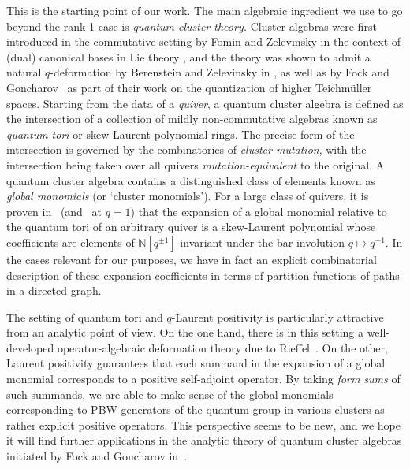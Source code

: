 \documentclass[11pt, reqno]{amsart}
\theoremstyle{definition}
\numberwithin{equation}{section}
\begin{document}
This is the starting point of our work. 
The main algebraic ingredient we use to go beyond the rank 1 case is \emph{quantum cluster theory.} Cluster algebras were first introduced in the commutative setting by Fomin and Zelevinsky in the context of (dual) canonical bases in Lie theory \cite{Lus93}, and the theory was shown to admit a natural $q$-deformation by Berenstein and Zelevinsky in \cite{BZ05}, as well as by Fock and Goncharov~\cite{FG09} as part of their work on the quantization of higher Teichm\"uller spaces. Starting from the data of a \emph{quiver}, a quantum cluster algebra is defined as the intersection of a collection of mildly non-commutative algebras known as \emph{quantum tori} or skew-Laurent polynomial rings. The precise form of the intersection is governed by the combinatorics of \emph{cluster mutation}, with the intersection being taken over all quivers \emph{mutation-equivalent} to the original. A quantum cluster algebra contains a distinguished class of elements known as \emph{global monomials} (or `cluster monomials'). For a large class of quivers, it is proven in~\cite{DM21} (and~\cite{GHKK18} at $q=1$) that the expansion of a global monomial relative to the quantum tori of an arbitrary quiver is a skew-Laurent polynomial whose coefficients are elements of $\mathbb{N}[q^{\pm1}]$ invariant under the bar involution $q\mapsto q^{-1}$. In the cases relevant for our purposes, we have in fact an explicit combinatorial description of these expansion coefficients in terms of partition functions of paths in a directed graph. 

The setting of quantum tori and $q$-Laurent positivity is particularly attractive from an analytic point of view. On the one hand, there is in this setting a well-developed operator-algebraic deformation theory due to Rieffel~\cite{Rie93}. On the other, Laurent positivity guarantees that each summand in the expansion of a global monomial corresponds to a positive self-adjoint operator. By taking \emph{form sums} of such summands, we are able to make sense of the global monomials corresponding to PBW generators of the quantum group in various clusters as rather explicit positive operators.  This perspective seems to be new, and we hope it will find further applications in the analytic theory of quantum cluster algebras initiated by Fock and Goncharov in~\cite{FG09}. 
\end{document}
